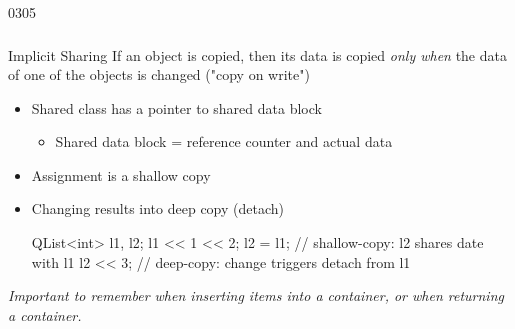 \begin{slide}[fragile]{0305}\frametitle{}
\begin{block}{Implicit Sharing}
If an object is copied, then its data is copied \textit{only when} the data of one of
the objects is changed ("copy on write")
\end{block}
\begin{itemize}
  \item Shared class has a pointer to shared data block
  \begin{itemize}
    \item Shared data block = reference counter and actual data
 \end{itemize}  
  \item Assignment is a shallow copy
  \item Changing results into deep copy (detach)
\begin{cpp}
QList<int> l1, l2; l1 << 1 << 2;
l2 = l1; // shallow-copy: l2 shares date with l1
l2 << 3; // deep-copy: change triggers detach from l1
\end{cpp}  
\end{itemize}
\textit{Important to remember when inserting items into a container, or when returning a container.}
\end{slide}
